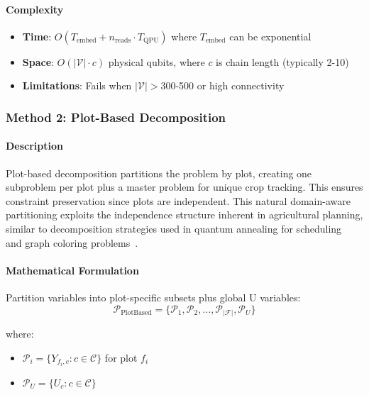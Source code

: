 \documentclass{oqireport}
\begin{document}
\paragraph{Complexity}
\begin{itemize}
\item \textbf{Time}: $O(T_{\text{embed}} + n_{\text{reads}} \cdot T_{\text{QPU}})$ where $T_{\text{embed}}$ can be exponential
\item \textbf{Space}: $O(|\mathcal{V}| \cdot c)$ physical qubits, where $c$ is chain length (typically 2-10)
\item \textbf{Limitations}: Fails when $|\mathcal{V}| > 300$-500 or high connectivity
\end{itemize}


\subsubsection{Method 2: Plot-Based Decomposition}

\paragraph{Description}
Plot-based decomposition partitions the problem by plot, creating one subproblem per plot plus a master problem for unique crop tracking. This ensures constraint preservation since plots are independent. This natural domain-aware partitioning exploits the independence structure inherent in agricultural planning, similar to decomposition strategies used in quantum annealing for scheduling~\cite{venturelli2015quantum} and graph coloring problems~\cite{titiloye2011quantum}.

\paragraph{Mathematical Formulation}

Partition variables into plot-specific subsets plus global U variables:
\begin{equation}
\mathcal{P}_{\text{PlotBased}} = \{\mathcal{P}_1, \mathcal{P}_2, \ldots, \mathcal{P}_{|\mathcal{F}|}, \mathcal{P}_U\}
\end{equation}

where:
\begin{itemize}
\item $\mathcal{P}_i = \{Y_{f_i,c} : c \in \mathcal{C}\}$ for plot $f_i$
\item $\mathcal{P}_U = \{U_c : c \in \mathcal{C}\}$
\end{itemize}
\end{document}
